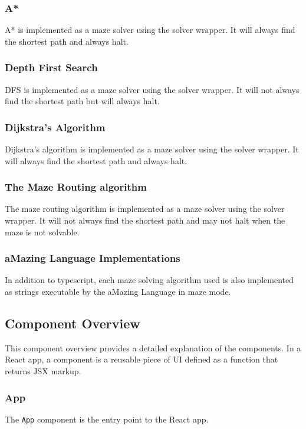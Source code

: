 \subsubsection{A*}

A* \cite{a-star-alg} is implemented as a maze solver using the solver wrapper. It will always find the shortest path and always halt.

\subsubsection{Depth First Search}

DFS \cite{pkd} is implemented as a maze solver using the solver wrapper. It will not always find the shortest path but will always halt.

\subsubsection{Dijkstra's Algorithm}

Dijkstra's algorithm \cite{dijkstras-alg} is implemented as a maze solver using the solver wrapper. It will always find the shortest path and always halt.

\subsubsection{The Maze Routing algorithm}

The maze routing algorithm \cite{maze-routing-alg} is implemented as a maze solver using the solver wrapper. It will not always find the shortest path and may not halt when the maze is not solvable.

\subsubsection{aMazing Language Implementations}

In addition to typescript, each maze solving algorithm used is also implemented as strings executable by the aMazing Language in maze mode.

\subsection{Component Overview}
This component overview provides a detailed explanation of the components. In a React app, a component is a reusable piece of UI defined as a function that returns JSX markup.

\subsubsection{App}
The \texttt{App} component is the entry point to the React app.

